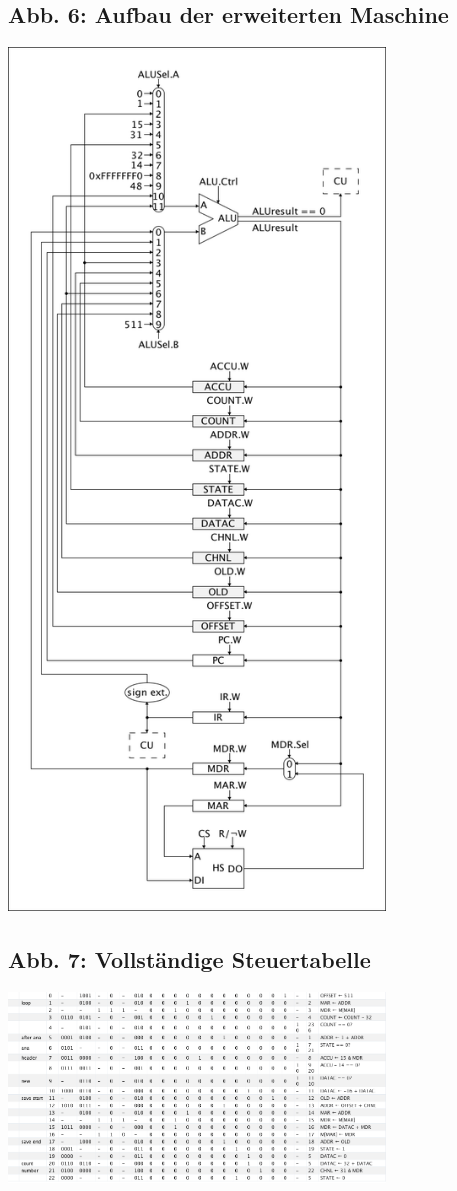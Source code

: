 \documentclass[12pt,titlepage]{article}
\begin{document}
\subsection{Abb. 6: Aufbau der erweiterten Maschine}
\includegraphics[width=10cm]{schematics_added.png}

\subsection{Abb. 7: Vollständige Steuertabelle}
\includegraphics[width=10cm]{signal_table.png}
\end{document}
